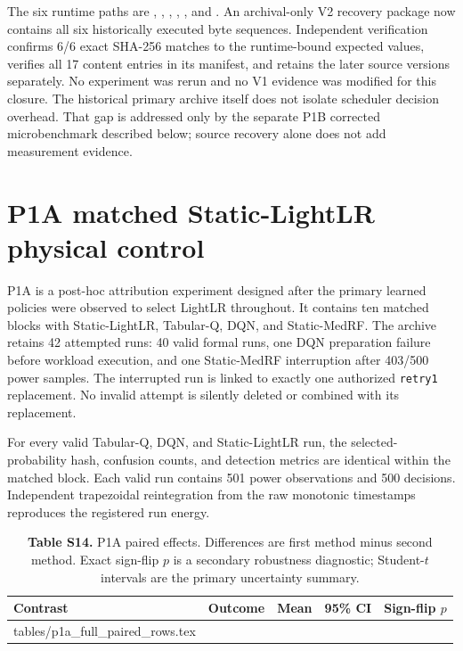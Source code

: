 \documentclass[10pt,a4paper]{article}
\makeatletter
\newcommand{\tableinput}[1]{\@@input #1.tex }
\makeatother
\begin{document}
The six runtime paths are , , , , , and . An archival-only V2 recovery package now contains all six historically executed byte sequences. Independent verification confirms 6/6 exact SHA-256 matches to the runtime-bound expected values, verifies all 17 content entries in its manifest, and retains the later source versions separately. No experiment was rerun and no V1 evidence was modified for this closure. The historical primary archive itself does not isolate scheduler decision overhead. That gap is addressed only by the separate P1B corrected microbenchmark described below; source recovery alone does not add measurement evidence.

\section{P1A matched Static-LightLR physical control}
P1A is a post-hoc attribution experiment designed after the primary learned policies were observed to select LightLR throughout. It contains ten matched blocks with Static-LightLR, Tabular-Q, DQN, and Static-MedRF. The archive retains 42 attempted runs: 40 valid formal runs, one DQN preparation failure before workload execution, and one Static-MedRF interruption after 403/500 power samples. The interrupted run is linked to exactly one authorized \texttt{retry1} replacement. No invalid attempt is silently deleted or combined with its replacement.

For every valid Tabular-Q, DQN, and Static-LightLR run, the selected-probability hash, confusion counts, and detection metrics are identical within the matched block. Each valid run contains 501 power observations and 500 decisions. Independent trapezoidal reintegration from the raw monotonic timestamps reproduces the registered run energy.

\begin{table}[h!]
\centering\footnotesize
\caption*{\textbf{Table S14.} P1A paired effects. Differences are first method minus second method. Exact sign-flip $p$ is a secondary robustness diagnostic; Student-$t$ intervals are the primary uncertainty summary.}
\setlength{\tabcolsep}{3.2pt}
\begin{tabular}{llrrr}\toprule
Contrast & Outcome & Mean & 95\% CI & Sign-flip $p$\\\midrule
\tableinput{tables/p1a_full_paired_rows}
\bottomrule\end{tabular}
\end{table}
\end{document}
